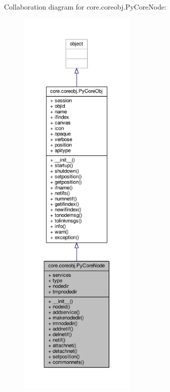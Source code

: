 Collaboration diagram for core.\+coreobj.\+Py\+Core\+Node\+:
\nopagebreak
\begin{figure}[H]
\begin{center}
\leavevmode
\includegraphics[height=550pt]{classcore_1_1coreobj_1_1_py_core_node__coll__graph}
\end{center}
\end{figure}
